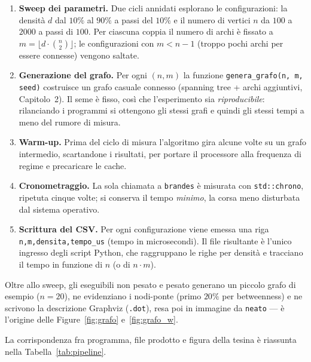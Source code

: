 \documentclass[11pt,a4paper]{report}
\begin{document}
\begin{enumerate}
	\item \textbf{Sweep dei parametri.} Due cicli annidati esplorano le
	      configurazioni: la densità $d$ dal $10\%$ al $90\%$ a passi del $10\%$ e
	      il numero di vertici $n$ da $100$ a $2000$ a passi di $100$. Per ciascuna
	      coppia il numero di archi è fissato a $m=\lfloor d\cdot\binom{n}{2}\rfloor$;
	      le configurazioni con $m<n-1$ (troppo pochi archi per essere connesse)
	      vengono saltate.
	\item \textbf{Generazione del grafo.} Per ogni $(n,m)$ la funzione
	      \texttt{genera\_grafo(n, m, seed)} costruisce un grafo casuale connesso
	      (spanning tree + archi aggiuntivi, Capitolo~2). Il seme è fisso, così che
	      l'esperimento sia \emph{riproducibile}: rilanciando i programmi si ottengono
	      gli stessi grafi e quindi gli stessi tempi a meno del rumore di misura.
	\item \textbf{Warm-up.} Prima del ciclo di misura l'algoritmo gira alcune volte
	      su un grafo intermedio, scartandone i risultati, per portare il processore
	      alla frequenza di regime e precaricare le cache.
	\item \textbf{Cronometraggio.} La sola chiamata a \texttt{brandes} è misurata con
	      \texttt{std::chrono}, ripetuta cinque volte; si conserva il tempo
	      \emph{minimo}, la corsa meno disturbata dal sistema operativo.
	\item \textbf{Scrittura del CSV.} Per ogni configurazione viene emessa una riga
	      \texttt{n,m,densita,tempo\_us} (tempo in microsecondi). Il file risultante è
	      l'unico ingresso degli script Python, che raggruppano le righe per densità e
	      tracciano il tempo in funzione di $n$ (o di $n\cdot m$).
\end{enumerate}

Oltre allo sweep, gli eseguibili non pesato e pesato generano un piccolo grafo di
esempio ($n=20$), ne evidenziano i nodi-ponte (primo $20\%$ per betweenness) e ne
scrivono la descrizione Graphviz (\texttt{.dot}), resa poi in immagine da
\texttt{neato} --- è l'origine delle Figure~\ref{fig:grafo} e~\ref{fig:grafo_w}.

La corrispondenza fra programma, file prodotto e figura della tesina è riassunta
nella Tabella~\ref{tab:pipeline}.
\end{document}
